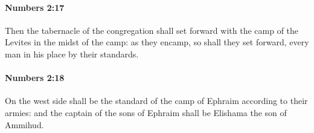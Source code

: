 		\paragraph{Numbers 2:17} %
			\label{NUMBERS-2-17}

			Then the tabernacle of the congregation shall set forward with the camp of the Levites in the midst of the camp: as they encamp, so shall they set forward, every man in his place by their standards.


		\paragraph{Numbers 2:18} %
			\label{NUMBERS-2-18}

			On the west side shall be the standard of the camp of Ephraim according to their armies: and the captain of the sons of Ephraim shall be Elishama the son of Ammihud.


